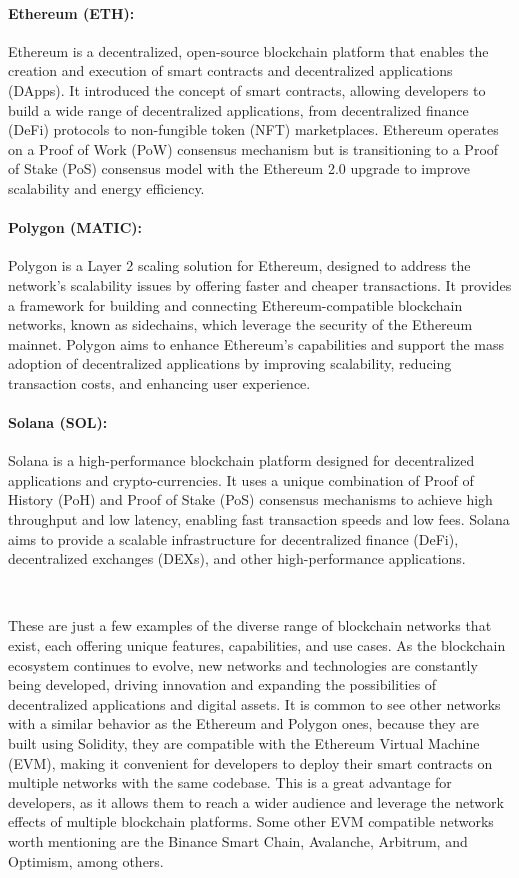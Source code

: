 \paragraph{Ethereum (ETH):}
Ethereum is a decentralized, open-source blockchain platform that enables the creation and execution of smart contracts and decentralized applications (DApps). It introduced the concept of smart contracts, allowing developers to build a wide range of decentralized applications, from decentralized finance (DeFi) protocols to non-fungible token (NFT) marketplaces. Ethereum operates on a Proof of Work (PoW) consensus mechanism but is transitioning to a Proof of Stake (PoS) consensus model with the Ethereum 2.0 upgrade to improve scalability and energy efficiency.

\paragraph{Polygon (MATIC):}
Polygon is a Layer 2 scaling solution for Ethereum, designed to address the network's scalability issues by offering faster and cheaper transactions. It provides a framework for building and connecting Ethereum-compatible blockchain networks, known as sidechains, which leverage the security of the Ethereum mainnet. Polygon aims to enhance Ethereum's capabilities and support the mass adoption of decentralized applications by improving scalability, reducing transaction costs, and enhancing user experience.

\paragraph{Solana (SOL):}
Solana is a high-performance blockchain platform designed for decentralized applications and crypto-currencies. It uses a unique combination of Proof of History (PoH) and Proof of Stake (PoS) consensus mechanisms to achieve high throughput and low latency, enabling fast transaction speeds and low fees. Solana aims to provide a scalable infrastructure for decentralized finance (DeFi), decentralized exchanges (DEXs), and other high-performance applications.

~

These are just a few examples of the diverse range of blockchain networks that exist, each offering unique features, capabilities, and use cases. As the blockchain ecosystem continues to evolve, new networks and technologies are constantly being developed, driving innovation and expanding the possibilities of decentralized applications and digital assets.
It is common to see other networks with a similar behavior as the Ethereum and Polygon ones, because they are built using Solidity, they are compatible with the Ethereum Virtual Machine (EVM), making it convenient for developers to deploy their smart contracts on multiple networks with the same codebase. This is a great advantage for developers, as it allows them to reach a wider audience and leverage the network effects of multiple blockchain platforms. Some other EVM compatible networks worth mentioning are the Binance Smart Chain, Avalanche, Arbitrum, and Optimism, among others.

